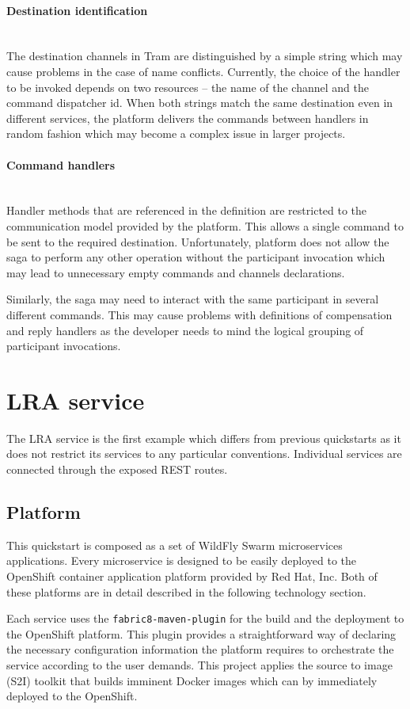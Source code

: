 \documentclass[oneside,
  digital, %
  table,   %
  lof,     %
  lot,     %
]{fithesis3}
\newcommand{\newlinepar}[1]{\paragraph{#1}\needspace{4\baselineskip}\mbox{}\\}
\begin{document}
\newlinepar{Destination identification}

The destination channels in Tram are distinguished by a simple string which may cause problems in the case of name conflicts. Currently, the choice of the handler to be invoked depends on two resources -- the name of the channel and the command dispatcher id. When both strings match the same destination even in different services, the platform delivers the commands between handlers in random fashion which may become a complex issue in larger projects.

\newlinepar{Command handlers}

Handler methods that are referenced in the definition are restricted to the communication model provided by the platform. This allows a single command to be sent to the required destination. Unfortunately, platform does not allow the saga to perform any other operation without the participant invocation which may lead to unnecessary empty commands and channels declarations. 

Similarly, the saga may need to interact with the same participant in several different commands. This may cause problems with definitions of compensation and reply handlers as the developer needs to mind the logical grouping of participant invocations.

\section{LRA service}

The LRA service is the first example which differs from previous quickstarts as it does not restrict its services to any particular conventions. Individual services are connected through the exposed REST routes.

\subsection{Platform}

This quickstart is composed as a set of WildFly Swarm microservices applications. Every microservice is designed to be easily deployed to the OpenShift container application platform provided by Red Hat, Inc. \cite{openshift} Both of these platforms are in detail described in the following technology section.

Each service uses the \texttt{fabric8-maven-plugin} for the build and the deployment to the OpenShift platform. This plugin provides a straightforward way of declaring the necessary configuration information the platform requires to orchestrate the service according to the user demands. This project applies the source to image (S2I) toolkit that builds imminent Docker images which can by immediately deployed to the OpenShift. 
\end{document}
